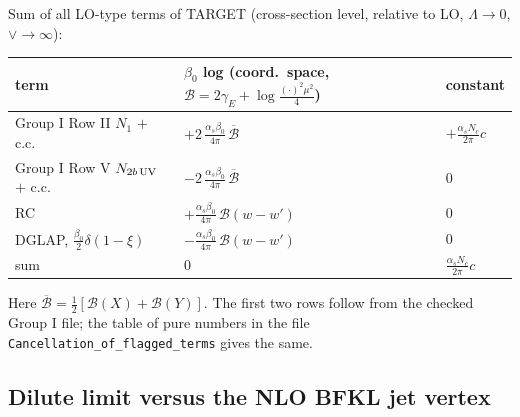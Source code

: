 Sum of all LO-type terms of TARGET (cross-section level, relative to LO, $\Lambda\to0$, $\vee\to\infty$):
\begin{center}
\renewcommand{\arraystretch}{1.25}
\begin{tabular}{|l|l|l|}\hline
term & $\beta_{0}$ log (coord.\ space, $\mathcal B=2\gamma_{E}+\log\frac{(\cdot)^{2}\mu^{2}}{4}$) & constant\\\hline
Group I Row II $N_{1}$ $+$ c.c. & $+2\,\frac{\alpha_{s}\beta_{0}}{4\pi}\,\overline{\mathcal B}$ & $+\frac{\alpha_{s}N_{c}}{2\pi}c$\\
Group I Row V $N_{2b\,\rm UV}$ $+$ c.c. & $-2\,\frac{\alpha_{s}\beta_{0}}{4\pi}\,\overline{\mathcal B}$ & $0$\\
RC & $+\frac{\alpha_{s}\beta_{0}}{4\pi}\,\mathcal B(w-w')$ & $0$\\
DGLAP, $\frac{\beta_{0}}{2}\delta(1-\xi)$ & $-\frac{\alpha_{s}\beta_{0}}{4\pi}\,\mathcal B(w-w')$ & $0$\\\hline
sum & $0$ & $\frac{\alpha_{s}N_{c}}{2\pi}c$\\\hline
\end{tabular}
\end{center}
Here $\overline{\mathcal B}=\frac12[\mathcal B(X)+\mathcal B(Y)]$. The first two rows follow from the checked Group I file; the table of pure numbers in the file \texttt{Cancellation\_of\_\allowbreak flagged\_\allowbreak terms} gives the same.

\subsection{Dilute limit versus the NLO BFKL jet vertex}

